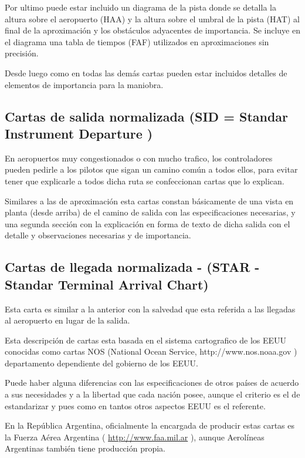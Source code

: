 \documentclass[a4paper,12pt,twoside]{article}
\begin{document}
Por ultimo puede estar incluido un diagrama de la pista donde se detalla la
altura sobre el aeropuerto (HAA) y la altura sobre el umbral de la pista (HAT)
al final de la aproximaci\'on y los obst\'aculos adyacentes de importancia. Se incluye en el diagrama una tabla de tiempos (FAF) utilizados en aproximaciones sin
precisi\'on.

Desde luego como en todas las dem\'as cartas pueden estar incluidos detalles de
elementos de importancia para la maniobra.

\subsection{Cartas de salida normalizada  (SID = Standar Instrument Departure )}
\label{sec:cartas-de-salida-normalizada}


En aeropuertos muy congestionados o con mucho trafico, los controladores
pueden pedirle a los pilotos que sigan un camino com\'un a todos ellos, para
evitar tener que explicarle a todos dicha ruta se confeccionan cartas que lo
explican.

Similares a las de aproximaci\'on esta cartas constan b\'asicamente de una vista
en planta (desde arriba) de el camino de salida con las especificaciones
necesarias, y una segunda secci\'on con la explicaci\'on en forma de texto de
dicha salida con el detalle y observaciones necesarias y de importancia.

\subsection{Cartas de llegada normalizada - (STAR - Standar Terminal Arrival Chart)}
\label{sec:cartas-de-llegada-normalizada}


Esta carta es similar a la anterior con la salvedad que esta referida a las
llegadas al aeropuerto en lugar de la salida.

Esta descripci\'on de cartas esta basada en el sistema cartografico de los EEUU
conocidas como cartas NOS (National Ocean Service, http://www.nos.noaa.gov )
departamento dependiente del gobierno de los EEUU.

Puede haber alguna diferencias con las especificaciones de otros pa\'ises de
acuerdo a sus necesidades y a la libertad que cada naci\'on posee, aunque el
criterio es el de estandarizar y pues como en tantos otros aspectos EEUU es el
referente.

En la Rep\'ublica Argentina, oficialmente la encargada de producir estas cartas
es la Fuerza A\'erea Argentina (
\url{http://www.faa.mil.ar} 
), aunque Aerol\'ineas
Argentinas tambi\'en tiene producci\'on propia.
\end{document}
